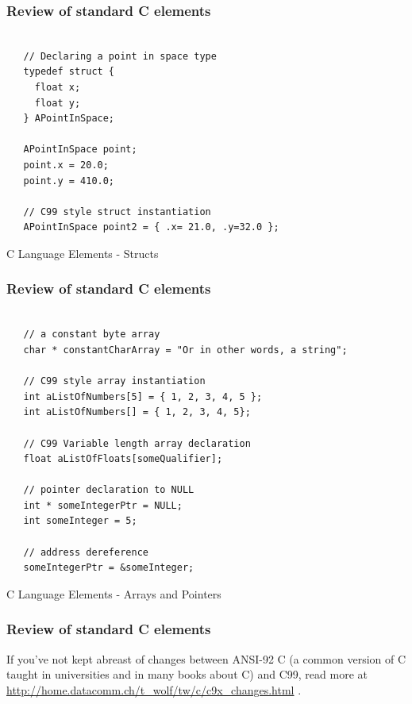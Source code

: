 \documentclass[10pt]{beamer}
\begin{document}
\begin{frame}[fragile]
  \frametitle{Review of standard C elements}
  \begin{listing}[H]
     \begin{verbatim}

   // Declaring a point in space type             
   typedef struct {
     float x;
     float y;
   } APointInSpace;

   APointInSpace point;
   point.x = 20.0;
   point.y = 410.0; 

   // C99 style struct instantiation              
   APointInSpace point2 = { .x= 21.0, .y=32.0 }; 

   \end{verbatim}
     \caption{C Language Elements - Structs}
     \label{listing:2}
   \end{listing}

\end{frame}

\begin{frame}[fragile]
  \frametitle{Review of standard C elements}
  \begin{listing}[H]
     \begin{verbatim}

   // a constant byte array             
   char * constantCharArray = "Or in other words, a string"; 

   // C99 style array instantiation
   int aListOfNumbers[5] = { 1, 2, 3, 4, 5 };
   int aListOfNumbers[] = { 1, 2, 3, 4, 5}; 

   // C99 Variable length array declaration
   float aListOfFloats[someQualifier];

   // pointer declaration to NULL              
   int * someIntegerPtr = NULL; 
   int someInteger = 5;

   // address dereference              
   someIntegerPtr = &someInteger; 

   \end{verbatim}
     \caption{C Language Elements - Arrays and Pointers}
     \label{listing:3}
   \end{listing}

\end{frame}

\begin{frame}[fragile]
  \frametitle{Review of standard C elements}
  If you've not kept abreast of changes between ANSI-92 C (a common version of C taught in universities and in many books about C) and C99, read more at \url{http://home.datacomm.ch/t_wolf/tw/c/c9x_changes.html} \cite{C99Changes}.

\end{frame}
\end{document}
